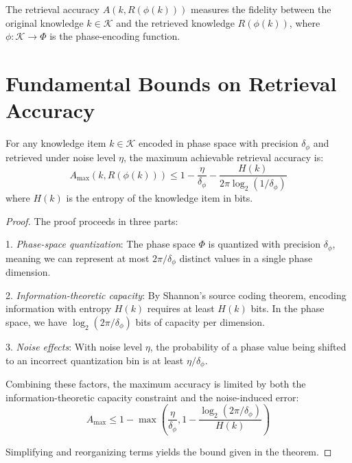 \begin{definition}
The retrieval accuracy $A(k, R(\phi(k)))$ measures the fidelity between the original knowledge $k \in \mathcal{K}$ and the retrieved knowledge $R(\phi(k))$, where $\phi: \mathcal{K} \rightarrow \Phi$ is the phase-encoding function.
\end{definition}

\section{Fundamental Bounds on Retrieval Accuracy}

\begin{theorem}
For any knowledge item $k \in \mathcal{K}$ encoded in phase space with precision $\delta_\phi$ and retrieved under noise level $\eta$, the maximum achievable retrieval accuracy is:
\begin{equation}
A_{\max}(k, R(\phi(k))) \leq 1 - \frac{\eta}{\delta_\phi} - \frac{H(k)}{2\pi \log_2(1/\delta_\phi)}
\end{equation}
where $H(k)$ is the entropy of the knowledge item in bits.
\end{theorem}

\begin{proof}
The proof proceeds in three parts:

1. \textit{Phase-space quantization}: The phase space $\Phi$ is quantized with precision $\delta_\phi$, meaning we can represent at most $2\pi / \delta_\phi$ distinct values in a single phase dimension.

2. \textit{Information-theoretic capacity}: By Shannon's source coding theorem, encoding information with entropy $H(k)$ requires at least $H(k)$ bits. In the phase space, we have $\log_2(2\pi / \delta_\phi)$ bits of capacity per dimension.

3. \textit{Noise effects}: With noise level $\eta$, the probability of a phase value being shifted to an incorrect quantization bin is at least $\eta/\delta_\phi$.

Combining these factors, the maximum accuracy is limited by both the information-theoretic capacity constraint and the noise-induced error:
\begin{equation}
A_{\max} \leq 1 - \max\left(\frac{\eta}{\delta_\phi}, 1 - \frac{\log_2(2\pi / \delta_\phi)}{H(k)}\right)
\end{equation}

Simplifying and reorganizing terms yields the bound given in the theorem.
\end{proof}

